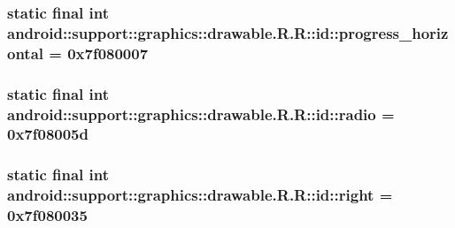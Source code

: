 \hypertarget{classandroid_1_1support_1_1graphics_1_1drawable_1_1_r_1_1id_490d493841e25cc420971dcc5abd0d52}{
\subsubsection[{progress\_\-horizontal}]{\setlength{\rightskip}{0pt plus 5cm}static final int android::support::graphics::drawable.R.R::id::progress\_\-horizontal = 0x7f080007}}
\label{classandroid_1_1support_1_1graphics_1_1drawable_1_1_r_1_1id_490d493841e25cc420971dcc5abd0d52}


\hypertarget{classandroid_1_1support_1_1graphics_1_1drawable_1_1_r_1_1id_9f4b98652c6341883664f47ef7700cae}{
\subsubsection[{radio}]{\setlength{\rightskip}{0pt plus 5cm}static final int android::support::graphics::drawable.R.R::id::radio = 0x7f08005d}}
\label{classandroid_1_1support_1_1graphics_1_1drawable_1_1_r_1_1id_9f4b98652c6341883664f47ef7700cae}


\hypertarget{classandroid_1_1support_1_1graphics_1_1drawable_1_1_r_1_1id_043bf4fbb46443bdbda868ebceb3b659}{
\subsubsection[{right}]{\setlength{\rightskip}{0pt plus 5cm}static final int android::support::graphics::drawable.R.R::id::right = 0x7f080035}}
\label{classandroid_1_1support_1_1graphics_1_1drawable_1_1_r_1_1id_043bf4fbb46443bdbda868ebceb3b659}


